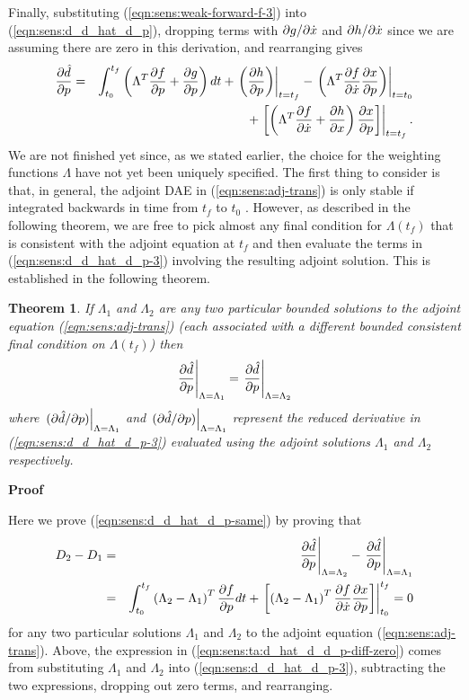 \documentclass[pdf,ps2pdf,11pt]{SANDreport}
\newtheorem{theorem}{Theorem}
\begin{document}
Finally, substituting (\ref{eqn:sens:weak-forward-f-3}) into
(\ref{eqn:sens:d_d_hat_d_p}), dropping terms with $\partial g / \partial \dot{x}$ and
$\partial h / \partial \dot{x}$ since we are assuming there are zero in this derivation,
and rearranging gives
%
\begin{eqnarray}
\displaystyle{\frac{\partial \hat{d}}{\partial p}} 
& = & \int_{t_0}^{t_f} \left( \Lambda^T \displaystyle{\frac{\partial f}{\partial p}} + \displaystyle{\frac{\partial g}{\partial p}} \right) dt
  + \left. \left( \displaystyle{\frac{\partial h}{\partial p}} \right) \right|_{t=t_f}
  - \left. \left( \Lambda^T \displaystyle{\frac{\partial f}{\partial \dot{x}}} \displaystyle{\frac{\partial x}{\partial p}} \right) \right|_{t=t_0}
\nonumber \\
& & + \left. \left[ \left(
    \Lambda^T \displaystyle{\frac{\partial f}{\partial \dot{x}}}
    +  \displaystyle{\frac{\partial h}{\partial x}}
  \right)  \displaystyle{\frac{\partial x}{\partial p}} \right] \right|_{t=t_f}.
\label{eqn:sens:d_d_hat_d_p-3}
\end{eqnarray}
%
We are not finished yet since, as we stated earlier, the choice for the
weighting functions $\Lambda$ have not yet been uniquely specified.  The first
thing to consider is that, in general, the adjoint DAE in
(\ref{eqn:sens:adj-trans}) is only stable if integrated backwards
in time from $t_f$ to $t_0$ {}\cite{adjoint-sens-2003}.  However, as described
in the following theorem, we are free to pick almost any final condition for
$\Lambda(t_f)$ that is consistent with the adjoint equation at $t_f$ and then
evaluate the terms in (\ref{eqn:sens:d_d_hat_d_p-3}) involving
the resulting adjoint solution.  This is established in the following theorem.

\begin{theorem}
If $\Lambda_1$ and $\Lambda_2$ are any two particular bounded solutions to the
adjoint equation (\ref{eqn:sens:adj-trans}) (each associated with
a different bounded consistent final condition on $\Lambda(t_f)$) then
%
\begin{equation}
\left.\displaystyle{\frac{\partial \hat{d}}{\partial p}}\right|_{\Lambda=\Lambda_1} = \left.\displaystyle{\frac{\partial \hat{d}}{\partial p}}\right|_{\Lambda=\Lambda_2}
\label{eqn:sens:d_d_hat_d_p-same}
\end{equation}
%
where $\left.(\partial \hat{d} / \partial p)\right|_{\Lambda=\Lambda_1}$ and
$\left.(\partial \hat{d} / \partial p)\right|_{\Lambda=\Lambda_1}$ represent the reduced
derivative in (\ref{eqn:sens:d_d_hat_d_p-3}) evaluated using the
adjoint solutions $\Lambda_1$ and $\Lambda_2$ respectively.
\end{theorem}

\textbf{Proof}

Here we prove (\ref{eqn:sens:d_d_hat_d_p-same}) by proving that
%
\begin{eqnarray}
D_2 - D_1
& = &
\left.\displaystyle{\frac{\partial \hat{d}}{\partial p}}\right|_{\Lambda=\Lambda_2} - \left.\displaystyle{\frac{\partial \hat{d}}{\partial p}}\right|_{\Lambda=\Lambda_1}
\nonumber \\
& = &
\int_{t_0}^{t_f} \left( \Lambda_2 - \Lambda_1 \right)^T \displaystyle{\frac{\partial f}{\partial p}} dt
+ \left.\left[ \left( \Lambda_2 - \Lambda_1 \right)^T \displaystyle{\frac{\partial f}{\partial \dot{x}}} \displaystyle{\frac{\partial x}{\partial p}} \right]\right|_{t_0}^{t_f}
= 0
\label{eqn:sens:ta:d_hat_d_d_p-diff-zero}
\end{eqnarray}
%
for any two particular solutions $\Lambda_1$ and $\Lambda_2$ to the adjoint
equation (\ref{eqn:sens:adj-trans}).  Above, the expression in
(\ref{eqn:sens:ta:d_hat_d_d_p-diff-zero}) comes from substituting $\Lambda_1$
and $\Lambda_2$ into (\ref{eqn:sens:d_d_hat_d_p-3}), subtracting the two
expressions, dropping out zero terms, and rearranging.
\end{document}
